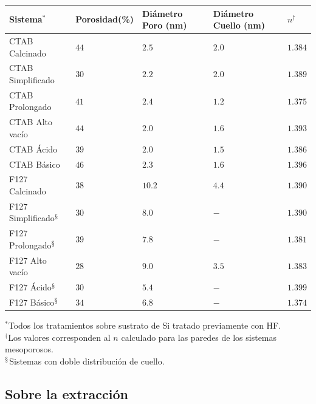 {\begin{table}[ht]
\begin{tabular}{>{\raggedright\arraybackslash}m{3cm}>{\centering\arraybackslash}m{2.2cm}>{\centering\arraybackslash}m{2cm}>{\centering\arraybackslash}m{2cm}>{\centering\arraybackslash}m{0.8cm}}
				 Sistema$^*$ &  Porosidad(\%) & Diámetro Poro (nm)   & Diámetro Cuello (nm) & $n^\dagger$ \\

				\midrule

				 CTAB Calcinado 	& $44$ & $2.5$ & $2.0$ & $1.384$ \\
				 CTAB Simplificado  & $30$ & $2.2$ & $2.0$ & $1.389$ \\
				 CTAB Prolongado 	& $41$ & $2.4$ & $1.2$ & $1.375$ \\
				 CTAB Alto vacío 	& $44$ & $2.0$ & $1.6$ & $1.393$ \\
				 CTAB Ácido 		& $39$ & $2.0$ & $1.5$ & $1.386$ \\
				 CTAB Básico 		& $46$ & $2.3$ & $1.6$ & $1.396$ \\
				\midrule

				 F127 Calcinado 	& $38$ & $10.2$ & $4.4$ & $1.390$ \\
				 F127 Simplificado$^\mathsection$  & $30$ & $8.0$  & $ - $ & $1.390$ \\
				 F127 Prolongado$^\mathsection$ 	& $39$ & $7.8$ & $ - $ 	& $1.381$ \\
				 F127 Alto vacío 	& $28$ & $9.0$ & $3.5$  & $1.383$ \\
				 F127 Ácido$^\mathsection$ 		& $30$ & $5.4$ & $ - $  & $1.399$ \\
				 F127 Básico$^\mathsection$ 		& $34$ & $6.8$ & $ - $  & $1.374$ \\
				\bottomrule
				\end{tabular}\vspace*{2pt}
				\footnotesize{$^*$Todos los tratamientos sobre sustrato de Si tratado previamente con HF.}\\
				\footnotesize{$^\dagger$Los valores corresponden al $n$ calculado para las paredes de los sistemas mesoporosos.}\\
				\footnotesize{$^\mathsection$Sistemas con doble distribución de cuello.} \\
				\label{tabla:Resultados_EPA}
				\end{table}	
		
    \subsection{Sobre la extracción}	
		
}
